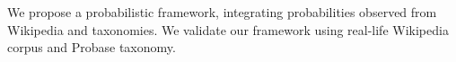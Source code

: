 


We propose a probabilistic framework, integrating probabilities observed
from Wikipedia and taxonomies.
We validate our framework using real-life Wikipedia corpus and Probase taxonomy.


